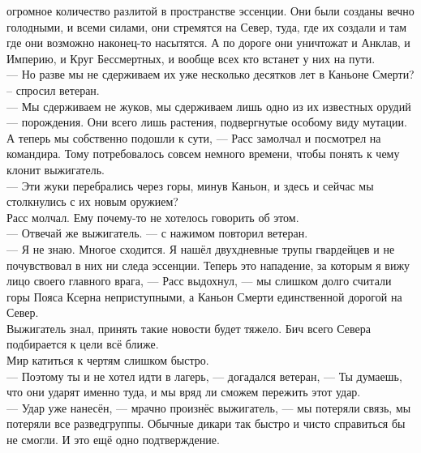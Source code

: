 огромное количество разлитой в пространстве эссенции. Они были созданы вечно 
голодными, и всеми силами, они стремятся на Север, туда, где их создали и там 
где они возможно наконец-то насытятся. А по дороге они уничтожат и Анклав, и 
Империю, и Круг Бессмертных, и вообще всех кто встанет у них на пути.\\
--- Но разве мы не сдерживаем их уже несколько десятков лет в Каньоне Смерти? – 
спросил ветеран.\\
--- Мы сдерживаем не жуков, мы сдерживаем лишь одно из их известных орудий --- 
порождения. Они всего лишь растения, подвергнутые особому виду мутации. А теперь 
мы собственно подошли к сути, --- Расс замолчал и посмотрел на командира. Тому 
потребовалось совсем немного времени,  чтобы понять к чему клонит выжигатель.\\
--- Эти жуки перебрались через горы, минув Каньон, и здесь и сейчас мы 
столкнулись с их новым оружием?\\
Расс молчал. Ему почему-то не хотелось говорить об этом.\\
--- Отвечай же выжигатель. --- с нажимом повторил ветеран.\\
--- Я не знаю. Многое сходится. Я нашёл двухдневные трупы гвардейцев и не 
почувствовал в них ни следа эссенции. Теперь это нападение, за которым я вижу 
лицо своего главного врага, --- Расс выдохнул, --- мы слишком долго считали 
горы Пояса Ксерна неприступными, а Каньон Смерти единственной дорогой на 
Север.\\
Выжигатель знал, принять такие новости будет тяжело. Бич всего Севера 
подбирается к цели всё ближе. \\
Мир катиться к чертям слишком быстро.\\
--- Поэтому ты и не хотел идти в лагерь, --- догадался ветеран, --- Ты думаешь, 
что они ударят именно туда, и мы вряд ли сможем пережить этот удар.\\
--- Удар уже нанесён, --- мрачно произнёс выжигатель, --- мы потеряли связь, мы 
потеряли все разведгруппы. Обычные дикари так быстро и чисто справиться бы не 
смогли. И это ещё одно подтверждение.

